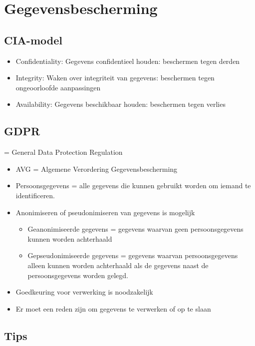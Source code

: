 \documentclass{article}
\begin{document}
\section{Gegevensbescherming}

\subsection{CIA-model}

\begin{itemize}
    \item Confidentiality: Gegevens confidentieel houden: beschermen tegen derden
    \item Integrity: Waken over integriteit van gegevens: beschermen tegen ongeoorloofde aanpassingen
    \item Availability: Gegevens beschikbaar houden: beschermen tegen verlies
\end{itemize}

\subsection{GDPR}

= General Data Protection Regulation

\begin{itemize}
    \item AVG = Algemene Verordering Gegevensbescherming
    \item Persoonsgegevens = alle gegevens die kunnen gebruikt worden om iemand te identificeren.
    \item Anonimiseren of pseudonimiseren van gegevens is mogelijk
    \begin{itemize}
        \item Geanonimiseerde gegevens = gegevens waarvan geen persoonsgegevens kunnen worden achterhaald
        \item Gepseudonimiseerde gegevens = gegevens waarvan persoonsgegevens alleen kunnen worden achterhaald als de gegevens naast de persoonsgegevens worden gelegd.
    \end{itemize}
    \item Goedkeuring voor verwerking is noodzakelijk
    \item Er moet een reden zijn om gegevens te verwerken of op te slaan
\end{itemize}


\subsection{Tips}
\end{document}
